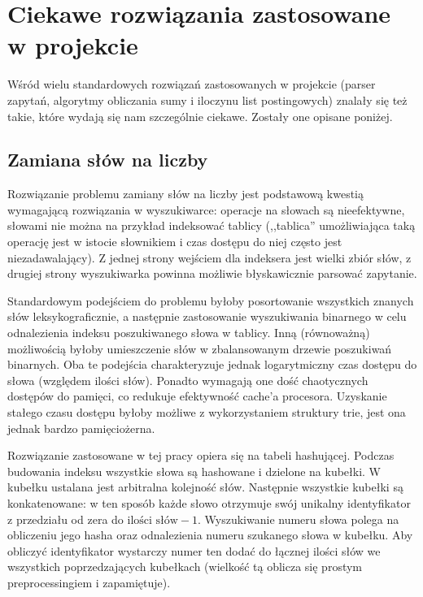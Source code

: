 \documentclass[a4paper,12pt]{article}
\begin{document}
\section{Ciekawe rozwiązania zastosowane w projekcie}
Wśród wielu standardowych rozwiązań zastosowanych w projekcie (parser zapytań,
algorytmy obliczania sumy i iloczynu list postingowych) znalały się też takie,
które wydają się nam szczególnie ciekawe. Zostały one opisane poniżej.

\subsection{Zamiana słów na liczby}
Rozwiązanie problemu zamiany słów na liczby jest podstawową kwestią wymagającą
rozwiązania w wyszukiwarce: operacje na słowach są nieefektywne, słowami nie
można na przykład indeksować tablicy (,,tablica'' umożliwiająca taką operację
jest w istocie słownikiem i czas dostępu do niej często jest niezadawalający).
Z jednej strony wejściem dla indeksera jest wielki zbiór słów, z drugiej strony
wyszukiwarka powinna możliwie błyskawicznie parsować zapytanie.

Standardowym podejściem do problemu byłoby posortowanie wszystkich znanych słów
leksykograficznie, a następnie zastosowanie wyszukiwania binarnego w celu
odnalezienia indeksu poszukiwanego słowa w tablicy. Inną (równoważną)
możliwością byłoby umieszczenie słów w zbalansowanym drzewie poszukiwań
binarnych. Oba te podejścia charakteryzuje jednak logarytmiczny czas dostępu do
słowa (względem ilości słów). Ponadto wymagają one dość chaotycznych dostępów
do pamięci, co redukuje efektywność cache'a procesora. Uzyskanie stałego czasu
dostępu byłoby możliwe z wykorzystaniem struktury trie, jest ona jednak bardzo
pamięciożerna.

Rozwiązanie zastosowane w tej pracy opiera się na tabeli hashującej.
Podczas budowania indeksu wszystkie słowa są hashowane i dzielone na kubełki.
W kubełku ustalana jest arbitralna kolejność słów. Następnie wszystkie kubełki
są konkatenowane: w ten sposób każde słowo otrzymuje swój unikalny
identyfikator z przedziału od zera do $\text{ilości słów} - 1$. Wyszukiwanie
numeru słowa polega na obliczeniu jego hasha oraz odnalezienia numeru szukanego
słowa w kubełku. Aby obliczyć identyfikator wystarczy numer ten dodać do
łącznej ilości słów we wszystkich poprzedzających kubełkach (wielkość tą
oblicza się prostym preprocessingiem i zapamiętuje).
\end{document}
